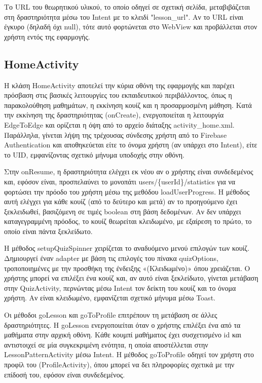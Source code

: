 \documentclass[11pt]{report}
\begin{document}
Το URL του θεωρητικού υλικού, το οποίο οδηγεί σε σχετική σελίδα, μεταβιβάζεται στη δραστηριότητα μέσω του Intent με το κλειδί "lesson\_url". Αν το URL είναι έγκυρο (δηλαδή όχι null), τότε αυτό φορτώνεται στο WebView και προβάλλεται στον χρήστη εντός της εφαρμογής. 

\subsection{HomeActivity}

Η κλάση HomeActivity αποτελεί την κύρια οθόνη της εφαρμογής και παρέχει πρόσβαση στις βασικές λειτουργίες του εκπαιδευτικού περιβάλλοντος, όπως η παρακολούθηση μαθημάτων, η εκκίνηση κουίζ και η προσαρμοσμένη μάθηση. Κατά την εκκίνηση της δραστηριότητας (onCreate), ενεργοποιείται η λειτουργία EdgeToEdge και ορίζεται η όψη από το αρχείο διάταξης activity\_home.xml. Παράλληλα, γίνεται λήψη της τρέχουσας σύνδεσης χρήστη από το Firebase Authentication και αποθηκεύεται είτε το όνομα χρήστη (αν υπάρχει στο Intent), είτε το UID, εμφανίζοντας σχετικό μήνυμα υποδοχής στην οθόνη.

Στην onResume, η δραστηριότητα ελέγχει εκ νέου αν ο χρήστης είναι συνδεδεμένος και, εφόσον είναι, προσπελαύνει το μονοπάτι users/\{userId\}/statistics για να φορτώσει την πρόοδο του χρήστη μέσω της μεθόδου loadUserProgress. Η μέθοδος αυτή ελέγχει για κάθε κουίζ (από το δεύτερο και μετά) αν το προηγούμενο έχει ξεκλειδωθεί, βασιζόμενη σε τιμές boolean στη βάση δεδομένων. Αν δεν υπάρχει καταγεγραμμένη πρόοδος, το κουίζ θεωρείται κλειδωμένο, με εξαίρεση το πρώτο, το οποίο είναι πάντα ξεκλείδωτο.

Η μέθοδος setupQuizSpinner χειρίζεται το αναδυόμενο μενού επιλογών των κουίζ. Δημιουργεί έναν adapter με βάση τις επιλογές του πίνακα quizOptions, τροποποιημένες με την προσθήκη της ένδειξης «(Κλειδωμένο)» όπου χρειάζεται. Ο χρήστης μπορεί να επιλέξει ένα κουίζ και, αν αυτό είναι ξεκλείδωτο, γίνεται μετάβαση στην QuizActivity, περνώντας μέσω Intent τον δείκτη του κουίζ και το όνομα χρήστη. Αν είναι κλειδωμένο, εμφανίζεται σχετικό μήνυμα μέσω Toast.

Οι μέθοδοι goLesson και goToProfile επιτρέπουν τη μετάβαση σε άλλες δραστηριότητες. Η goLesson ενεργοποιείται όταν ο χρήστης επιλέξει ένα από τα μαθήματα στην αρχική οθόνη. Κάθε κουμπί μαθήματος έχει συσχετισμένο id και αντιστοιχεί σε μία συγκεκριμένη ενότητα, η οποία αποστέλλεται στην LessonPatternActivity μέσω Intent. Η μέθοδος goToProfile οδηγεί τον χρήστη στο προφίλ του (ProfileActivity), όπου μπορεί να δει πληροφορίες σχετικά με την επίδοσή του, εφόσον είναι συνδεδεμένος.
\end{document}
